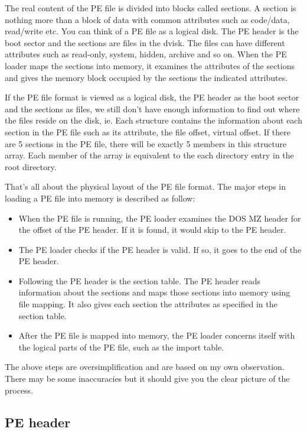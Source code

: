 The real content of the PE file is divided into blocks called sections. A section is nothing more than a block of data with common attributes such as code/data, read/write etc. You can think of a PE file as a logical disk. The PE header is the boot sector and the sections are files in the dvisk. The files can have different attributes such as read-only, system, hidden, archive and so on. When the PE loader maps the sections into memory, it examines the attributes of the sections and gives the memory block occupied by the sections the indicated attributes.

If the PE file format is viewed as a logical disk, the PE header as the boot sector and the sections as files, we still don't have enough information to find out where the files reside on the disk, ie. Each structure contains the information about each section in the PE file such as its attribute, the file offset, virtual offset. If there are 5 sections in the PE file, there will be exactly 5 members in this structure array. Each member of the array is equivalent to the each directory entry in the root directory.

That's all about the physical layout of the PE file format. The major steps in loading a PE file into memory is described as follow:

\begin{itemize}
\item When the PE file is running, the PE loader examines the DOS MZ header for the offset of the PE header. If it is found, it would skip to the PE header.
\item The PE loader checks if the PE header is valid. If so, it goes to the end of the PE header.
\item Following the PE header is the section table. The PE header reads information about the sections and maps those sections into memory using file mapping. It also gives each section the attributes as specified in the section table.
\item After the PE file is mapped into memory, the PE loader concerns itself with the logical parts of the PE file, such as the import table.
\end{itemize}

The above steps are oversimplification and are based on my own observation. There may be some inaccuracies but it should give you the clear picture of the process.
\subsection{PE header}


